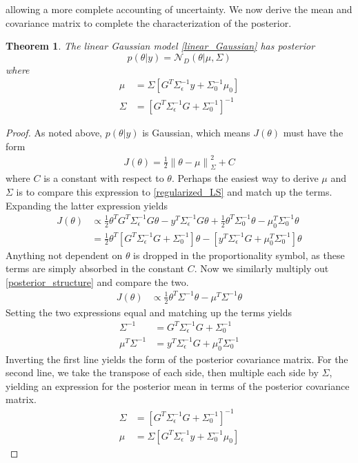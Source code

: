 \documentclass[12pt]{article}
\newcommand*{\norm}[1]{\left\lVert#1\right\rVert}
\newtheorem{thm}{Theorem}
\begin{document}
allowing a more complete accounting of uncertainty. We now derive the mean and covariance matrix to complete the characterization of the posterior. 
\begin{thm}
The linear Gaussian model \ref{linear_Gaussian} has posterior 
\[p(\theta|y) = \mathcal{N}_D(\theta|\mu, \Sigma)\]
where 
\begin{align} 
\mu &= \Sigma \left[G^T \Sigma_{\epsilon}^{-1}y + \Sigma_0^{-1} \mu_0 \right] \\
\Sigma &= \left[G^T \Sigma_{\epsilon}^{-1} G + \Sigma_0^{-1} \right]^{-1}
\end{align}
\end{thm}
\begin{proof} 
As noted above, $p(\theta|y)$ is Gaussian, which means $J(\theta)$ must have the form 
\begin{align}
J(\theta) = \frac{1}{2} \norm{\theta - \mu}^2_{\Sigma} + C \label{posterior_structure}
\end{align}
where $C$ is a constant with respect to $\theta$. Perhaps the easiest way to derive $\mu$ and $\Sigma$ is to compare this expression to \ref{regularized_LS} and match up the terms. 
Expanding the latter expression yields 
\begin{align*}
J(\theta) &\propto \frac{1}{2} \theta^T G^T \Sigma_{\epsilon}^{-1} G\theta - y^T \Sigma_{\epsilon}^{-1} G\theta + \frac{1}{2} \theta^T \Sigma_0^{-1} \theta - \mu_0^T \Sigma_0^{-1} \theta \\ 
&= \frac{1}{2} \theta^T \left[G^T \Sigma_\epsilon^{-1} G + \Sigma_0^{-1} \right] \theta - \left[y^T \Sigma_{\epsilon}^{-1} G + \mu_0^T \Sigma_0^{-1} \right] \theta
\end{align*}
Anything not dependent on $\theta$ is dropped in the proportionality symbol, as these terms are simply absorbed in the constant $C$.  
Now we similarly multiply out \ref{posterior_structure} and compare the two. 
\begin{align*}
J(\theta) &\propto \frac{1}{2} \theta^T \Sigma^{-1} \theta - \mu^T \Sigma^{-1} \theta
\end{align*}
Setting the two expressions equal and matching up the terms yields
\begin{align*}
\Sigma^{-1} &= G^T \Sigma_{\epsilon}^{-1} G + \Sigma_0^{-1} \\
\mu^T \Sigma^{-1} &= y^T \Sigma_{\epsilon}^{-1} G + \mu_0^T \Sigma_0^{-1}
\end{align*}
Inverting the first line yields the form of the posterior covariance matrix. For the second line, we take the transpose of each side, then multiple 
each side by $\Sigma$, yielding an expression for the posterior mean in terms of the posterior covariance matrix. 
\begin{align*}
\Sigma &= \left[G^T \Sigma_{\epsilon}^{-1} G + \Sigma_0^{-1} \right]^{-1} \\
\mu &= \Sigma \left[G^T \Sigma_{\epsilon}^{-1}y + \Sigma_0^{-1} \mu_0 \right]
\end{align*}
 
\end{proof} 
\end{document}

